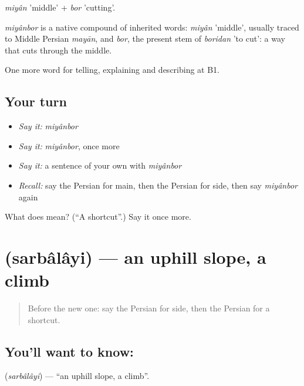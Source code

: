 \emph{miyân} 'middle' + \emph{bor} 'cutting'.

\begin{cousinweb}
\emph{miyânbor} is a native compound of inherited words: \emph{miyân} 'middle', usually traced to Middle Persian \emph{mayān}, and \emph{bor}, the present stem of \emph{boridan} 'to cut': a way that cuts through the middle.
\end{cousinweb}

\begin{grammarlens}[title={What you've built}]
One more word for telling, explaining and describing at B1.
\end{grammarlens}

\subsection*{Your turn}
\begin{itemize}
\raggedright
  \item \emph{Say it:} \emph{miyânbor}
  \item \emph{Say it:} \emph{miyânbor}, once more
  \item \emph{Say it:} a sentence of your own with \emph{miyânbor}
  \item \emph{Recall:} say the Persian for main, then the Persian for side, then say \emph{miyânbor} again
\end{itemize}

\begin{tcolorbox}[breakable,colback=teal!4,colframe=teal!35!black,title={Before you move on}]
What does  mean? (\textquotedblleft{}A shortcut\textquotedblright{}.) Say it once more.
\end{tcolorbox}
\section[\texorpdfstring{\fa{سربالایی} (sarbâlâyi)}{سربالایی (sarbâlâyi)}]{ (sarbâlâyi) — an uphill slope, a climb}

\label{lesson:FA-C448-sarbalayi}



\begin{quote}
Before the new one: say the Persian for side, then the Persian for a shortcut.
\end{quote}

\subsection*{You'll want to know: }
\textbf{} (\emph{sarbâlâyi}) — \textquotedblleft{}an uphill slope, a climb\textquotedblright{}.

